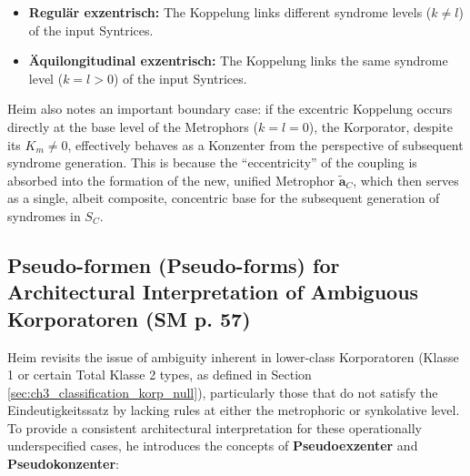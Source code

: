 \documentclass[
    12pt,              %
    a4paper,           %
    headings=normal,   %
    twoside=true,      %
    BCOR=8mm,          %
]{scrbook}
\newcommand{\q}[1]{\enquote{#1}}
\newcommand{\metrophor}{\bm{\widetilde{a}}}
\begin{document}
\begin{itemize}
        \begin{itemize}
            \item   \textbf{Regulär exzentrisch:} The Koppelung links different syndrome levels (\(k \neq l\)) of the input Syntrices.
            \item   \textbf{Äquilongitudinal exzentrisch:} The Koppelung links the same syndrome level (\(k=l > 0\)) of the input Syntrices.
        \end{itemize}
        Heim also notes an important boundary case: if the excentric Koppelung occurs directly at the base level of the Metrophors (\(k=l=0\)), the Korporator, despite its \(K_m \neq 0\), effectively behaves as a Konzenter from the perspective of subsequent syndrome generation. This is because the \q{eccentricity} of the coupling is absorbed into the formation of the new, unified Metrophor \(\metrophor_C\), which then serves as a single, albeit composite, concentric base for the subsequent generation of syndromes in \(S_C\).
\end{itemize}

\subsection{Pseudo-formen (Pseudo-forms) for Architectural Interpretation of Ambiguous Korporatoren (SM p. 57)}
\label{sec:ch3_pseudo_formen_original} 

Heim revisits the issue of ambiguity inherent in lower-class Korporatoren (Klasse 1 or certain Total Klasse 2 types, as defined in Section \ref{sec:ch3_classification_korp_null}), particularly those that do not satisfy the Eindeutigkeitssatz by lacking rules at either the metrophoric or synkolative level. To provide a consistent architectural interpretation for these operationally underspecified cases, he introduces the concepts of \textbf{Pseudoexzenter} and \textbf{Pseudokonzenter}:
\end{document}
